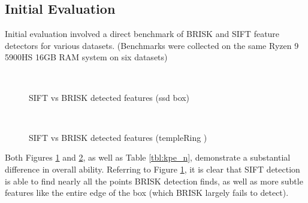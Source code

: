 \documentclass[conference,compsoc]{IEEEtran}
\begin{document}
\subsection{Initial Evaluation}
Initial evaluation involved a direct benchmark of 
BRISK and SIFT feature detectors for various datasets. 
(Benchmarks were collected on the same Ryzen 9 5900HS 16GB RAM system on six datasets)
\begin{figure}[ht!]
    \centering
    \
    \caption{SIFT vs BRISK detected features (ssd box)}
    \label{fig:br_vs_si}
\end{figure}
\begin{figure}[ht!]
    \centering
    \
    \caption{SIFT vs BRISK detected features (templeRing \cite{temple})}
    \label{fig:brt_vs_sit}
\end{figure}
Both Figures \ref{fig:br_vs_si} and \ref{fig:brt_vs_sit}, as well as Table \ref{tbl:kpe_n}, 
demonstrate a substantial difference in overall ability. Referring to Figure \ref{fig:br_vs_si}, it is clear that 
SIFT detection is able to find nearly all the points BRISK detection finds, as well as
more subtle features like the entire edge of the box (which BRISK largely fails to detect).
\end{document}
